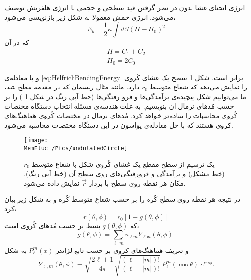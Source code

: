 \setRL


انرژی انحنای غشا بدون در نظر گرفتن قید سطحی و حجمی با انرژی هلفریش 
\cite{Helfrich1973}
توصیف می‌شود. انرژی خمش معمولا به شکل زیر بازنویسی می‌شود،
\begin{equation}
E_{b}=\frac{1}{2}\kappa\int dS\left(H-H_0\right)^2
\label{eq:HelfrichBendingEnergyH}
\end{equation}
که در آن
\begin{equation}
\begin{aligned}
H=C_1+C_2\\
H_0=2C_0
\end{aligned}
\end{equation}

و با معادله‌ی 
\ref{eq:HelfrichBendingEnergy}
برابر است. شکل
\ref{fig:undulatedCircle}
سطح یک غشای کُروی را نمایش می‌دهد که شعاع متوسط 
$r_0$
دارد. مانند مثال ریسمان که در مقدمه مطح شد، ما می‌توانیم شکل پیچیده‌ی برآمدگی‌ها و فرو رفتگی‌ها (خط آبی رنگ در شکل 
\ref{fig:undulatedCircle}
) را بر حسب مُد‌های نرمال آن بنویسیم. به علت هندسه‌ی مسئله انتخاب دستگاه مختصات کُروی محاسبات را ساده‌تر خواهد کرد. مُد‌های نرمال در مختصات کُروی هماهنگ‌های کروی
هستند که با حل معادله‌ی پواسون در این دستگاه مختصات محاسبه می‌شود. 
\begin{figure}[h]
\begin{center}
\texttt{[image: \\MemFluc /Pics/undulatedCircle]}
\caption{
یک ترسیم از سطح مقطع یک غشای کُروی شکل با شعاع متوسط 
$r_0$
(خط مشکل) و برآمدگی و فرورفتگی‌های روی سطح آن (خط آبی رنگ). مکان هر نقطه روی سطح با بردار 
$\vec r$
نمایش داده می‌شود.
}
\label{fig:undulatedCircle}
\end{center}
\end{figure}
در نتیجه هر نقطه روی سطح کُره را بر حسب شعاع متوسط کُره و به شکل زیر بیان کرد،
\begin{equation}
r(\theta,\phi)=r_0\left[1+g(\theta,\phi)\right]
\end{equation}
که 
$g(\theta,\phi)$
بسط بر حسب مُدهای کُروی است،
\begin{equation}
g(\theta,\phi)=\sum_{\ell,m}u_{\ell m}Y_{\ell m} (\theta,\phi).
\label{eq:gdef}
\end{equation}
و تعریف هماهنگ‌های کروی بر حسب تابع لژاندر
$P_\ell^m(x)$
به شکل
\begin{equation}
Y_{\ell,m}(\theta,\phi)=\sqrt{\frac{2\ell+1}{4\pi}}\sqrt{\frac{(\ell-|m|)!}{(\ell+|m|)!}}~P_\ell^m(\cos\theta)~e^{im\phi}.
\label{eq:rYlmLogandre}
\end{equation}
